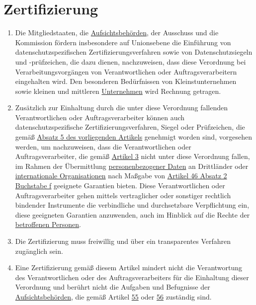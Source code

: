 \chapter{Zertifizierung}
\label{ch:42}


\begin{enumerate}

  \item Die Mitgliedstaaten, die \hyperref[itm:04-21]{Aufsichtsbehörden}, der Ausschuss und die Kommission fördern insbesondere auf
   Unionsebene die Einführung von datenschutzspezifischen Zertifizierungsverfahren sowie von Datenschutzsiegeln
   und -prüfzeichen, die dazu dienen, nachzuweisen, dass diese Verordnung bei Verarbeitungsvorgängen von
   Verantwortlichen oder Auftragsverarbeitern eingehalten wird. Den besonderen Bedürfnissen von Kleinstunternehmen
   sowie kleinen und mittleren \hyperref[itm:04-18]{Unternehmen} wird Rechnung getragen.
  \label{itm:42-1}

  \item Zusätzlich zur Einhaltung durch die unter diese Verordnung fallenden Verantwortlichen oder Auftragsverarbeiter
   können auch datenschutzspezifische Zertifizierungsverfahren, Siegel oder Prüfzeichen, die gemäß \hyperref[itm:42-5]
   {Absatz 5 des vorliegenden Artikels} genehmigt worden sind, vorgesehen werden, um nachzuweisen, dass die
   Verantwortlichen oder Auftragsverarbeiter, die gemäß \hyperref[ch:3]{Artikel 3} nicht unter diese Verordnung
   fallen, im Rahmen der Übermittlung \hyperref[itm:04-1]{personenbezogener Daten} an Drittländer oder \hyperref[itm:04-29]{internationale Organisationen} nach
   Maßgabe von \hyperref[itm:46-2f]{Artikel 46 Absatz 2 Buchstabe f} geeignete Garantien bieten. Diese Verantwortlichen
   oder Auftragsverarbeiter gehen mittels vertraglicher oder sonstiger rechtlich bindender Instrumente die verbindliche
   und durchsetzbare Verpflichtung ein, diese geeigneten Garantien anzuwenden, auch im Hinblick auf die Rechte der
   \hyperref[itm:04-1]{betroffenen Personen}.
  \label{itm:42-2}

  \item Die Zertifizierung muss freiwillig und über ein transparentes Verfahren zugänglich sein.
  \label{itm:42-3}

  \item Eine Zertifizierung gemäß diesem Artikel mindert nicht die Verantwortung des Verantwortlichen oder des
   Auftragsverarbeiters für die Einhaltung dieser Verordnung und berührt nicht die Aufgaben und Befugnisse der
   \hyperref[itm:04-21]{Aufsichtsbehörden}, die gemäß Artikel \hyperref[ch:55]{55} oder \hyperref[ch:56]{56} zuständig sind.
  \label{itm:42-4}


\end{enumerate}
